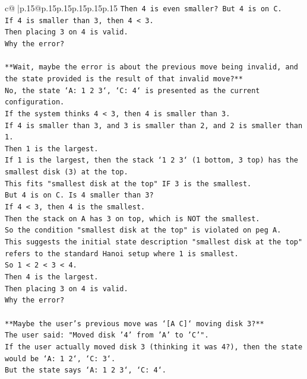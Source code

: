 \documentclass{article}
\begin{document}
{\begin{supertabular}{c@{$\;$}|p{.15\linewidth}@{}p{.15\linewidth}p{.15\linewidth}p{.15\linewidth}p{.15\linewidth}p{.15\linewidth}}
{{{\texttt{Then 4 is even smaller? But 4 is on C.} \\
\texttt{If 4 is smaller than 3, then 4 < 3.} \\
\texttt{Then placing 3 on 4 is valid.} \\
\texttt{Why the error?} \\
\\ 
\texttt{**Wait, maybe the error is about the previous move being invalid, and the state provided is the result of that invalid move?**} \\
\texttt{No, the state `A: 1 2 3`, `C: 4` is presented as the current configuration.} \\
\texttt{If the system thinks 4 < 3, then 4 is smaller than 3.} \\
\texttt{If 4 is smaller than 3, and 3 is smaller than 2, and 2 is smaller than 1.} \\
\texttt{Then 1 is the largest.} \\
\texttt{If 1 is the largest, then the stack `1 2 3` (1 bottom, 3 top) has the smallest disk (3) at the top.} \\
\texttt{This fits "smallest disk at the top" IF 3 is the smallest.} \\
\texttt{But 4 is on C. Is 4 smaller than 3?} \\
\texttt{If 4 < 3, then 4 is the smallest.} \\
\texttt{Then the stack on A has 3 on top, which is NOT the smallest.} \\
\texttt{So the condition "smallest disk at the top" is violated on peg A.} \\
\texttt{This suggests the initial state description "smallest disk at the top" refers to the standard Hanoi setup where 1 is smallest.} \\
\texttt{So 1 < 2 < 3 < 4.} \\
\texttt{Then 4 is the largest.} \\
\texttt{Then placing 3 on 4 is valid.} \\
\texttt{Why the error?} \\
\\ 
\texttt{**Maybe the user's previous move was `{[}A C{]}` moving disk 3?**} \\
\texttt{The user said: "Moved disk '4' from 'A' to 'C'".} \\
\texttt{If the user actually moved disk 3 (thinking it was 4?), then the state would be `A: 1 2`, `C: 3`.} \\
\texttt{But the state says `A: 1 2 3`, `C: 4`.} \\
}}}
\end{supertabular}}
\end{document}
